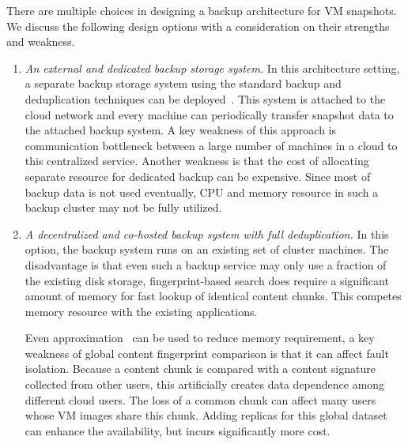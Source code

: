 There are multiple choices in designing a backup architecture  for VM snapshots.
We discuss the following design options with a consideration on their strengths and weakness.
\begin{enumerate}
\item  {\em An external and dedicated backup storage system.} 
In this architecture setting, a separate backup storage system using
the standard backup and deduplication techniques can be deployed~\cite{bottleneck08,extreme_binning09,sparseindex09}. 
This system is attached to the cloud network and every machine can periodically transfer snapshot data to 
the attached backup system. 
A key weakness of this approach is communication bottleneck between a large number of machines
in a cloud to this centralized  service.
Another weakness is that the cost of allocating separate resource for dedicated backup  can be expensive.
Since most of backup data is not used eventually, CPU and memory resource in such a backup cluster may not be fully utilized.
\item {\em A decentralized and co-hosted backup system with full deduplication.}
In this option, the backup system runs on an existing set of cluster machines.
The disadvantage is that 
even such a  backup service may only use  a fraction of the existing disk storage, 
fingerprint-based search does require a significant amount of memory for fast lookup of identical content chunks.
This competes memory resource  with the existing applications.

Even approximation~\cite{extreme_binning09,sparseindex09} can be used to reduce memory requirement,  
a  key weakness of global content fingerprint comparison is that it can affect fault isolation.
Because a content chunk is compared with a content signature collected from other users,
this artificially creates data dependence among different cloud users.
The loss of a common chunk can affect many users whose VM images share this 
chunk. Adding replicas for this global dataset can enhance the availability,
but incurs significantly more cost.

\end{enumerate}


